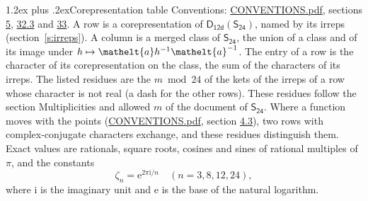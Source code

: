 \documentclass[10pt,a4paper]{article}
\makeatletter
\renewcommand\section{\@startsection{section}{1}{\z@}{-3ex plus -1ex minus -.2ex}%
  {1.2ex plus .2ex}{\normalfont\large\sffamily\bfseries\color{parttitle}}}
\numberwithin{equation}{section}
\newcommand{\eltfont}[1]{{\let\sigma\eltsigma\mathelt{#1}}}
\newcommand{\grp}[1]{\mathsf{#1}}
\newcommand{\elt}[1]{\eltfont{#1}}
\newcommand{\iunit}{\mathrm{i}}
\newcommand{\expe}{\mathrm{e}}
\newcommand{\rootunity}[1]{\zeta_{#1}}
\makeatother
\begin{document}
\section{Corepresentation table}\label{s:character_table}
Conventions: \href{../../CONVENTIONS.pdf}{CONVENTIONS.pdf}, sections \href{../../../rotation/CONVENTIONS.pdf\#conv.5}{5}, \href{../../CONVENTIONS.pdf\#conv.32.3}{32.3} and \href{../../CONVENTIONS.pdf\#conv.33}{33}.
A row is a corepresentation of $\grp{D_{12d}}(\grp{S_{24}})$, named by its irreps (section~\ref{s:irreps}). A column is a merged class of $\grp{S_{24}}$, the union of a class and of its image under $h \mapsto \elt{a} h^{-1} \elt{a}^{-1}$. The entry of a row is the character of its corepresentation on the class, the sum of the characters of its irreps.
\leavevmode\label{n:head.parity}The listed residues are the $m \bmod 24$ of the kets of the irreps of a row whose character is not real (a dash for the other rows). These residues follow the section Multiplicities and allowed $m$ of the document of \href{../../../rotation/data/pdf/S24.pdf}{$\grp{S_{24}}$}. Where a function moves with the points (\href{../../CONVENTIONS.pdf}{CONVENTIONS.pdf}, section \href{../../../rotation/CONVENTIONS.pdf\#conv.4.3}{4.3}), two rows with complex-conjugate characters exchange, and these residues distinguish them.
\leavevmode\label{n:constant.root}\label{n:index.root.order}Exact values are rationals, square roots, cosines and sines of rational multiples of $\pi$, and the constants
\begin{equation}\label{e:constants}\rootunity{n} = \expe^{2\pi\iunit/n}\quad(n = 3, 8, 12, 24),\end{equation}
where $\iunit$ is the imaginary unit and $\expe$ is the base of the natural logarithm.
\end{document}
